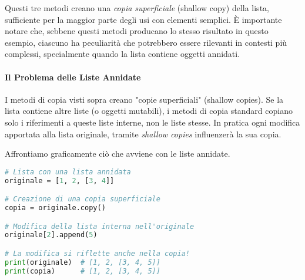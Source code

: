 Questi tre metodi creano una \textit{copia superficiale} (shallow copy) della lista, sufficiente per la maggior parte degli usi con elementi semplici. È importante notare che, sebbene questi metodi producano lo stesso risultato in questo esempio, ciascuno ha peculiarità che potrebbero essere rilevanti in contesti più complessi, specialmente quando la lista contiene oggetti annidati.



\paragraph{Il Problema delle Liste Annidate}\noindent

I metodi di copia visti sopra creano "copie superficiali" (shallow copies). Se la lista contiene altre liste (o oggetti mutabili), i metodi di copia standard copiano solo i riferimenti a queste liste interne, non le liste stesse. In pratica ogni modifica apportata alla lista originale, tramite \textit{shallow copies} influenzerà la sua copia.

Affrontiamo graficamente ciò che avviene con le liste annidate.

\begin{lstlisting}[language=Python]
# Lista con una lista annidata
originale = [1, 2, [3, 4]]

# Creazione di una copia superficiale
copia = originale.copy()

# Modifica della lista interna nell'originale
originale[2].append(5)

# La modifica si riflette anche nella copia!
print(originale)  # [1, 2, [3, 4, 5]]
print(copia)      # [1, 2, [3, 4, 5]]
\end{lstlisting}

